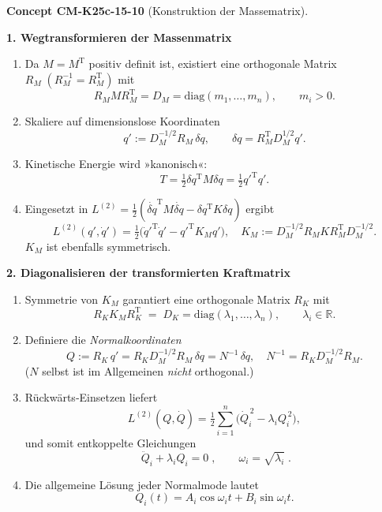 \documentclass[10pt, letterpaper]{article}
\newcommand{\CustomHeading}[3]{%
  \par\medskip\noindent%
  \textbf{#1 #2} \textnormal{(#3)}.\enskip%
}
\newenvironment{CONC}[2]{\begin{unitbox}\CustomHeading{Concept}{#1}{#2}}{\end{unitbox}}
\begin{document}
\begin{CONC}{CM-K25c-15-10}{Konstruktion der Massematrix}
\textbf{1. Wegtransformieren der Massenmatrix}

\begin{enumerate}[label=\textbf{\arabic*.},wide,labelindent=0pt,leftmargin=*]
\item
Da $M=M^{\mathrm T}$ positiv definit ist, existiert eine
orthogonale Matrix
\(R_M\;(R_M^{-1}=R_M^{\mathrm T})\) mit
\[
   R_M M R_M^{\mathrm T}=D_M=\mathrm{diag}(m_1,\dots,m_n),
   \qquad m_i>0 .
\]

\item
Skaliere auf dimension\-slose Koordinaten
\[
   q':=D_M^{-1/2}R_M\,\delta q,
   \qquad
   \delta q = R_M^{\mathrm T} D_M^{1/2} q'.
\]

\item
Kinetische Energie wird »kanonisch«:
\[
   T=\tfrac12\delta q^{\mathrm T}M\delta q
     =\tfrac12 q'^{\mathrm T}q'.
\]

\item
Eingesetzt in
\(L^{(2)}=\tfrac12(\dot{\delta q}^{\mathrm T}M\dot{\delta q}-
                    \delta q^{\mathrm T}K\delta q)\)
ergibt
\[
   L^{(2)}(q',\dot q')
   =\tfrac12\bigl(\dot q'^{\mathrm T}\dot q'
             -q'^{\mathrm T}K_M q'\bigr),
   \quad
   K_M:=D_M^{-1/2}R_M K R_M^{\mathrm T} D_M^{-1/2}.
\]
$K_M$ ist ebenfalls symmetrisch.
\end{enumerate}

\textbf{2. Diagonalisieren der transformierten Kraftmatrix}

\begin{enumerate}[label=\textbf{\arabic*.},wide,labelindent=0pt,leftmargin=*]
\item
Symmetrie von $K_M$ garantiert eine orthogonale Matrix
\(R_K\) mit
\[
   R_K K_M R_K^{\mathrm T}
   \;=\;
   D_K=\mathrm{diag}(\lambda_1,\dots,\lambda_n),
   \qquad \lambda_i\in\mathbb R .
\]

\item
Definiere die \emph{Normalkoordinaten}
\[
   Q := R_K\,q'
        = R_K D_M^{-1/2} R_M\,\delta q
        = N^{-1}\,\delta q,
   \quad
   \boxed{N^{-1}=R_K D_M^{-1/2}R_M}.
\]
(\(N\) selbst ist im Allgemeinen \emph{nicht}
orthogonal.)

\item
Rückwärts‐Einsetzen liefert
\[
   L^{(2)}(Q,\dot Q)=
   \tfrac12\sum_{i=1}^{n}
           \bigl(\dot Q_i^{\,2}-\lambda_i Q_i^{\,2}\bigr),
\]
und somit entkoppelte Gleichungen
\[
   \boxed{\;\ddot Q_i+\lambda_i Q_i = 0\;} ,
   \qquad
   \omega_i=\sqrt{\lambda_i}\;.
\]

\item
Die allgemeine Lösung jeder Normalmode lautet
\[
   \boxed{Q_i(t)=A_i\cos\omega_i t
             +B_i\sin\omega_i t}.
\]
\end{enumerate}
\end{CONC}
\end{document}
